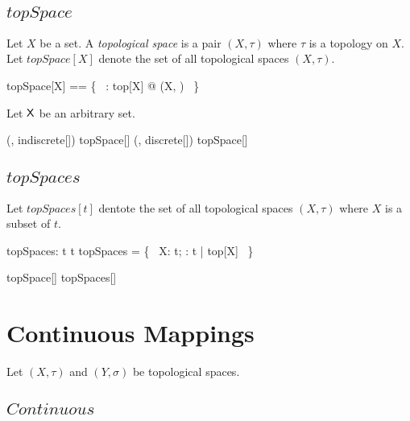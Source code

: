\documentclass[11pt, oneside]{article}
\begin{document}
\subsection{$topSpace$}

Let $X$ be a set.
A {\it topological space} is a pair $(X, \tau)$ where $\tau$ is a topology on $X$.
Let $topSpace[X]$ denote the set of all topological spaces $(X,\tau)$.

\begin{zed}
	topSpace[X] == \{~ \tau: top[X] @ (X, \tau) ~\}
\end{zed}

\begin{example}
Let $\mathsf{X}$ be an arbitrary set.

\begin{zed}
	(\setX, indiscrete[\setX]) \in topSpace[\setX]
\also
	(\setX, discrete[\setX]) \in topSpace[\setX]
\end{zed}


\end{example}

\subsection{$topSpaces$}

Let $topSpaces[t]$ dentote the set of all topological spaces $(X,\tau)$ where $X$ is a subset of $t$.

\begin{gendef}[t]
	topSpaces: \power t \rel \family t
\where
	topSpaces = \{~ X: \power t; \tau: \family t | \tau \in top[X] ~\}
\end{gendef}

\begin{remark}

\begin{zed}
	topSpace[\setX] \subseteq topSpaces[\setX]
\end{zed}

\end{remark}

\section{Continuous Mappings}

Let $(X,\tau)$ and $(Y,\sigma)$ be topological spaces.

\subsection{$Continuous$}
\end{document}
